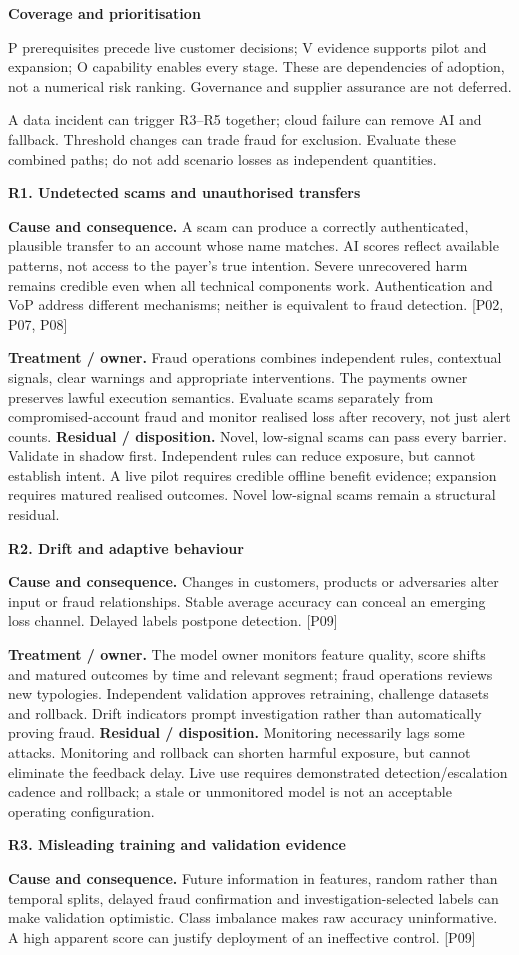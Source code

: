 \documentclass[11pt,a4paper]{article}
\newcommand{\heading}[2]{\vspace*{1mm}{\small\color{ink}\textbf{#1}}\par\vspace{2mm}{\LARGE\color{ink}\textbf{#2}}\par\vspace{3mm}}
\newcommand{\sub}[1]{\par\vspace{2mm}\textbf{\color{ink}#1}\par}
\newcommand{\src}[1]{{\small[#1]}}
\newcommand{\newpageof}[2]{\clearpage\normalsize\fontsize{10.5}{12.5}\selectfont\heading{#1}{#2}}
\newcommand{\risk}[2]{\sub{#1. #2}}
\begin{document}
\sub{Coverage and prioritisation}
P prerequisites precede live customer decisions; V evidence supports pilot and expansion; O capability enables every stage. These are dependencies of adoption, not a numerical risk ranking. Governance and supplier assurance are not deferred.

A data incident can trigger R3--R5 together; cloud failure can remove AI and fallback. Threshold changes can trade fraud for exclusion. Evaluate these combined paths; do not add scenario losses as independent quantities.

\newpageof{7 | Analysis and evaluation}{Fraud, model evidence and false rejection}
\risk{R1}{Undetected scams and unauthorised transfers}
\textbf{Cause and consequence.} A scam can produce a correctly authenticated, plausible transfer to an account whose name matches. AI scores reflect available patterns, not access to the payer's true intention. Severe unrecovered harm remains credible even when all technical components work. Authentication and VoP address different mechanisms; neither is equivalent to fraud detection. \src{P02, P07, P08}

\textbf{Treatment / owner.} Fraud operations combines independent rules, contextual signals, clear warnings and appropriate interventions. The payments owner preserves lawful execution semantics. Evaluate scams separately from compromised-account fraud and monitor realised loss after recovery, not just alert counts. \textbf{Residual / disposition.} Novel, low-signal scams can pass every barrier. Validate in shadow first. Independent rules can reduce exposure, but cannot establish intent. A live pilot requires credible offline benefit evidence; expansion requires matured realised outcomes. Novel low-signal scams remain a structural residual.
\risk{R2}{Drift and adaptive behaviour}
\textbf{Cause and consequence.} Changes in customers, products or adversaries alter input or fraud relationships. Stable average accuracy can conceal an emerging loss channel. Delayed labels postpone detection. \src{P09}

\textbf{Treatment / owner.} The model owner monitors feature quality, score shifts and matured outcomes by time and relevant segment; fraud operations reviews new typologies. Independent validation approves retraining, challenge datasets and rollback. Drift indicators prompt investigation rather than automatically proving fraud. \textbf{Residual / disposition.} Monitoring necessarily lags some attacks. Monitoring and rollback can shorten harmful exposure, but cannot eliminate the feedback delay. Live use requires demonstrated detection/escalation cadence and rollback; a stale or unmonitored model is not an acceptable operating configuration.
\risk{R3}{Misleading training and validation evidence}
\textbf{Cause and consequence.} Future information in features, random rather than temporal splits, delayed fraud confirmation and investigation-selected labels can make validation optimistic. Class imbalance makes raw accuracy uninformative. A high apparent score can justify deployment of an ineffective control. \src{P09}
\end{document}
